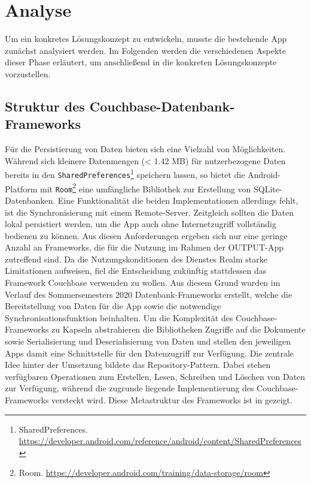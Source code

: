 \chapter{Analyse}\label{ch:analyse}

Um ein konkretes Lösungskonzept zu entwickeln, musste die bestehende App zunächst analysiert werden. Im Folgenden werden die verschiedenen Aspekte dieser Phase erläutert, um anschließend in  die konkreten Lösungskonzepte vorzustellen.

\section{Struktur des Couchbase-Datenbank-Frameworks}

Für die Persistierung von Daten bieten sich eine Vielzahl von Möglichkeiten. Während sich kleinere Datenmengen (< 1.42 MB) für nutzerbezogene Daten bereits in den \texttt{SharedPreferences}\footnote{SharedPreferences. \url{https://developer.android.com/reference/android/content/SharedPreferences}} speichern lassen, so bietet die Android-Platform mit \texttt{Room}\footnote{Room. \url{https://developer.android.com/training/data-storage/room}} eine umfängliche Bibliothek zur Erstellung von SQLite-Datenbanken. Eine Funktionalität die beiden Implementationen allerdings fehlt, ist die Synchronisierung mit einem Remote-Server. Zeitgleich sollten die Daten lokal persistiert werden, um die App auch ohne Internetzugriff vollständig bedienen zu können. Aus diesen Anforderungen ergeben sich nur eine geringe Anzahl an Frameworks, die für die Nutzung im Rahmen der OUTPUT-App zutreffend sind. Da die Nutzungskonditionen des Dienstes Realm starke Limitationen aufweisen, fiel die Entscheidung zukünftig stattdessen das Framework Couchbase verwenden zu wollen. Aus diesem Grund wurden im Verlauf des Sommersemesters 2020 Datenbank-Frameworks erstellt, welche die Bereitstellung von Daten für die App sowie die notwendige Synchronisationsfunktion beinhalten. Um die Komplexität des Couchbase-Frameworks zu Kapseln abstrahieren die Bibliotheken Zugriffe auf die Dokumente sowie Serialisierung und Deserialisierung von Daten und stellen den jeweiligen Apps damit eine Schnittstelle für den Datenzugriff zur Verfügung. Die zentrale Idee hinter der Umsetzung bildete das Repository-Pattern. Dabei stehen verfügbaren Operationen zum Erstellen, Lesen, Schreiben und Löschen von Daten zur Verfügung, während die zugrunde liegende Implementierung des Couchbase-Frameworks versteckt wird. Diese Metastruktur des Frameworks ist in  gezeigt.

